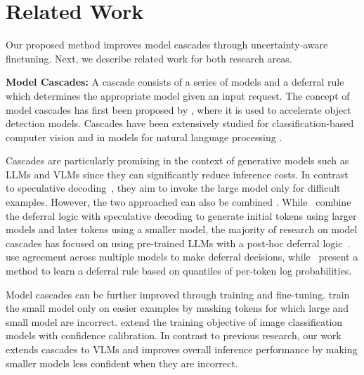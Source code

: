 \section{Related Work} \label{sec:related-word}

\sloppy
Our proposed method improves model cascades through uncertainty-aware finetuning. Next, we describe related work for both research areas.

\textbf{Model Cascades:} 
A cascade consists of a series of models and a deferral rule which determines the appropriate model given an input request. The concept of model cascades has first been proposed by \citet{990517}, where it is used to accelerate object detection models. Cascades have been extensively studied for classification-based computer vision \citep{Wang2017IDKCF, pmlr-v31-trapeznikov13a, Bolukbasi2017AdaptiveNN, NEURIPS2023_1f09e1ee} and in models for natural language processing \citep{dohan2022language, mamou2022tangobertreducinginferencecost, varshney-baral-2022-model}. 

Cascades are particularly promising in the context of generative models such as LLMs and VLMs since they can significantly reduce inference costs. In contrast to speculative decoding~\citep{leviathan2023fast}, they aim to invoke the large model only for difficult examples. However, the two approached can also be combined \citep{narasimhan2025faster}. While~\citet{chen2024cascade} combine the deferral logic with speculative decoding to generate initial tokens using larger models and later tokens using a smaller model, the majority of research on model cascades has focused on using pre-trained LLMs with a post-hoc deferral logic~\citep{NEURIPS2022_bc8f76d9, NEURIPS2023_1f09e1ee, yue2024large}. \citet{kolawole2024agreementbasedcascadingefficientinference} use agreement across multiple models to make deferral decisions, while~\citet{gupta2024languagemodelcascadestokenlevel} present a method to learn a deferral rule based on quantiles of per-token log probabilities. 

Model cascades can be further improved through training and fine-tuning. \citet{wang2024cascadeawaretraininglanguagemodels} train the small model only on easier examples by masking tokens for which large and small model are incorrect. \citet{Enomoro_Eda_2021} extend the training objective of image classification models with confidence calibration. In contrast to previous research, our work extends cascades to VLMs and improves overall inference performance by making smaller models less confident when they are incorrect.


